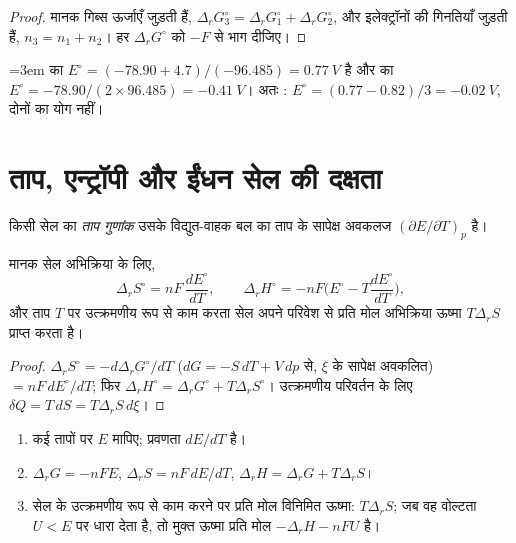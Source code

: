 \begin{proof}
मानक गिब्स ऊर्जाएँ जुड़ती हैं, $\Delta_r G_3^\circ = \Delta_r G_1^\circ + \Delta_r
G_2^\circ$, और इलेक्ट्रॉनों की गिनतियाँ जुड़ती हैं, $n_3 = n_1 + n_2$। हर $\Delta_r
G^\circ$ को $-F$ से भाग दीजिए।
\end{proof}

\begin{example}\label{ex:b2:cell-thermodynamics:iron}\emergencystretch=3em
 का $E^\circ = (-78.90 + 4.7)/(-96.485) = \qty{0.77}{V}$ है
और  का $E^\circ = -78.90/(2 \times 96.485) =
\qty{-0.41}{V}$। अतः : $E^\circ = (0.77 - 0.82)/3 =
\qty{-0.02}{V}$, दोनों का योग नहीं।
\end{example}

\section{ताप, एन्ट्रॉपी और ईंधन सेल की दक्षता}

\begin{definition}[ताप गुणांक]\label{def:b2:cell-thermodynamics:temperature-coefficient}
किसी सेल का \emph{ताप गुणांक} उसके विद्युत-वाहक बल का
ताप के सापेक्ष अवकलज $(\partial E/\partial T)_p$ है।
\end{definition}

\begin{proposition}[सेल आँकड़ों से एन्ट्रॉपी और एन्थैल्पी]\label{prop:b2:cell-thermodynamics:entropy}
मानक सेल अभिक्रिया के लिए,
\[
  \Delta_r S^\circ = nF\,\frac{dE^\circ}{dT}, \qquad
  \Delta_r H^\circ = -nF\Big(E^\circ - T\frac{dE^\circ}{dT}\Big),
\]
और ताप $T$ पर उत्क्रमणीय रूप से काम करता सेल अपने परिवेश से प्रति मोल
अभिक्रिया ऊष्मा $T\Delta_r S$ प्राप्त करता है।
\end{proposition}

\begin{proof}
$\Delta_r S^\circ = -d\Delta_r G^\circ/dT$ ($dG = -S\,dT + V\,dp$ से, $\xi$ के सापेक्ष
अवकलित) $= nF\,dE^\circ/dT$; फिर $\Delta_r H^\circ = \Delta_r G^\circ
+ T\Delta_r S^\circ$। उत्क्रमणीय परिवर्तन के लिए $\delta Q = T\,dS = T\Delta_r S\,
d\xi$।
\end{proof}

\begin{method}[सेल आँकड़ों से अभिक्रिया की ऊष्मागतिकी तक]\label{met:b2:cell-thermodynamics:cell-data}
\begin{enumerate}
  \item कई तापों पर $E$ मापिए; प्रवणता $dE/dT$ है।
  \item $\Delta_r G = -nFE$, $\Delta_r S = nF\,dE/dT$, $\Delta_r H = \Delta_r G +
        T\Delta_r S$।
  \item सेल के उत्क्रमणीय रूप से काम करने पर प्रति मोल विनिमित ऊष्मा: $T\Delta_r S$;
        जब वह वोल्टता $U < E$ पर धारा देता है, तो मुक्त ऊष्मा प्रति मोल
        $-\Delta_r H - nFU$ है।
\end{enumerate}
\end{method}

